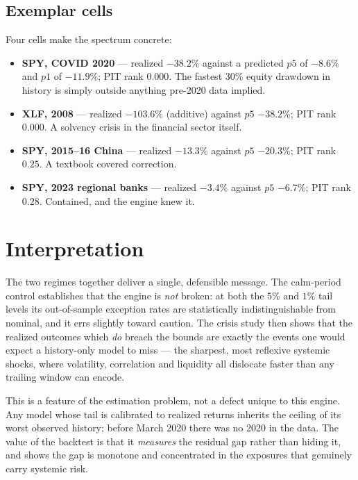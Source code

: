 \documentclass[11pt]{article}
\begin{document}
\subsection{Exemplar cells}
Four cells make the spectrum concrete:
\begin{itemize}[leftmargin=1.4em, itemsep=2pt]
  \item \textbf{SPY, COVID 2020} --- realized $-38.2\%$ against a predicted
  $p5$ of $-8.6\%$ and $p1$ of $-11.9\%$; PIT rank $0.000$. The fastest 30\%
  equity drawdown in history is simply outside anything pre-2020 data implied.
  \item \textbf{XLF, 2008} --- realized $-103.6\%$ (additive) against $p5$
  $-38.2\%$; PIT rank $0.000$. A solvency crisis in the financial sector itself.
  \item \textbf{SPY, 2015--16 China} --- realized $-13.3\%$ against $p5$
  $-20.3\%$; PIT rank $0.25$. A textbook covered correction.
  \item \textbf{SPY, 2023 regional banks} --- realized $-3.4\%$ against $p5$
  $-6.7\%$; PIT rank $0.28$. Contained, and the engine knew it.
\end{itemize}

\section{Interpretation}

The two regimes together deliver a single, defensible message. The calm-period
control establishes that the engine is \emph{not} broken: at both the $5\%$ and
$1\%$ tail levels its out-of-sample exception rates are statistically
indistinguishable from nominal, and it errs slightly toward caution. The crisis
study then shows that the realized outcomes which \emph{do} breach the bounds
are exactly the events one would expect a history-only model to miss --- the
sharpest, most reflexive systemic shocks, where volatility, correlation and
liquidity all dislocate faster than any trailing window can encode.

This is a feature of the estimation problem, not a defect unique to this
engine. Any model whose tail is calibrated to realized returns inherits the
ceiling of its worst observed history; before March 2020 there was no 2020 in
the data. The value of the backtest is that it \emph{measures} the residual
gap rather than hiding it, and shows the gap is monotone and concentrated in
the exposures that genuinely carry systemic risk.
\end{document}
